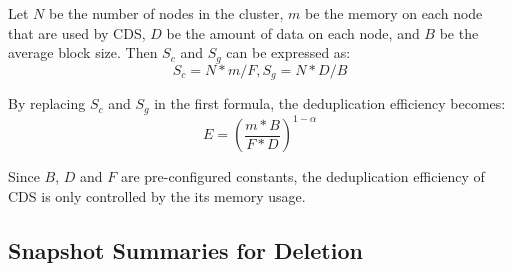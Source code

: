 Let $N$ be the number of nodes in the cluster, $m$ be the memory on each node that are used by CDS, $D$ be the amount of data on each node, and $B$ be the average block size. Then $S_c$ and $S_g$ can be expressed as:
\begin{equation}
S_c = N*m/F, S_g = N*D/B
\end{equation}

By replacing $S_c$ and $S_g$ in the first formula, the deduplication efficiency becomes:
\begin{equation}
  E = (\frac{m*B}{F*D})^{1-\alpha}
\end{equation}

Since $B$, $D$ and $F$ are pre-configured constants, the deduplication efficiency of CDS is only controlled by the its memory usage.

\subsection{Snapshot Summaries for Deletion}